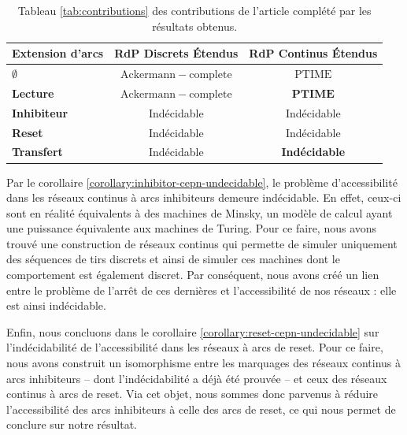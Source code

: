 \documentclass{article}
\theoremstyle{remark}
\theoremstyle{remark}
\begin{document}
\begin{table}[ht]
    \centering
    \setlength{\tabcolsep}{18pt}
    \setlength{\arrayrulewidth}{0.5mm}
    \renewcommand{\arraystretch}{1.75}
    \begin{tabular}{|l|c|c|}
        \hline
        \textbf{Extension d'arcs} & \textbf{RdP Discrets Étendus} & \textbf{RdP Continus Étendus}\\
        \hline
        $\boldsymbol{\emptyset}$ & $\mathrm{Ackermann-complete}$ & $\mathrm{PTIME}$                                   \\
        \textbf{Lecture}         & $\mathrm{Ackermann-complete}$ & \color{red} $\mathrm{\mathbf{PTIME}}$              \\
        \textbf{Inhibiteur}      & Indécidable                   & \cellcolor[HTML]{AAAAFF} \color{white} Indécidable \\
        \textbf{Reset}           & Indécidable                   & \cellcolor[HTML]{8888FF} \color{white} Indécidable \\
        \textbf{Transfert}       & Indécidable                   & \color{red} \textbf{Indécidable}                   \\
        \hline
    \end{tabular}
    \caption{Tableau \ref{tab:contributions} des contributions de l'article complété par les résultats obtenus.}
    \label{tab:filled-contributions}
\end{table}

Par le corollaire \ref{corollary:inhibitor-cepn-undecidable}, le problème d'accessibilité dans les réseaux continus à arcs inhibiteurs demeure indécidable. En effet, ceux-ci sont en réalité équivalents à des machines de Minsky, un modèle de calcul ayant une puissance équivalente aux machines de Turing. Pour ce faire, nous avons trouvé une construction de réseaux continus qui permette de simuler uniquement des séquences de tirs discrets et ainsi de simuler ces machines dont le comportement est également discret. Par conséquent, nous avons créé un lien entre le problème de l'arrêt de ces dernières et l'accessibilité de nos réseaux : elle est ainsi indécidable.

Enfin, nous concluons dans le corollaire \ref{corollary:reset-cepn-undecidable} sur l'indécidabilité de l'accessibilité dans les réseaux à arcs de reset. Pour ce faire, nous avons construit un isomorphisme entre les marquages des réseaux continus à arcs inhibiteurs -- dont l'indécidabilité a déjà été prouvée -- et ceux des réseaux continus à arcs de reset. Via cet objet, nous sommes donc parvenus à réduire l'accessibilité des arcs inhibiteurs à celle des arcs de reset, ce qui nous permet de conclure sur notre résultat.
\end{document}
